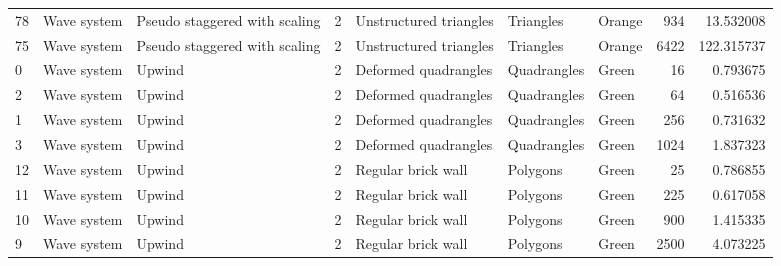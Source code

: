 \begin{tabular}{lllrlllrr}
78  &       Wave system &  Pseudo staggered with scaling &               2 &          Unstructured triangles &              Triangles  &                               Orange &                      934 &                        13.532008 \\
75  &       Wave system &  Pseudo staggered with scaling &               2 &          Unstructured triangles &              Triangles  &                               Orange &                     6422 &                       122.315737 \\
0   &       Wave system &                         Upwind &               2 &            Deformed quadrangles &            Quadrangles  &                                Green &                       16 &                         0.793675 \\
2   &       Wave system &                         Upwind &               2 &            Deformed quadrangles &            Quadrangles  &                                Green &                       64 &                         0.516536 \\
1   &       Wave system &                         Upwind &               2 &            Deformed quadrangles &            Quadrangles  &                                Green &                      256 &                         0.731632 \\
3   &       Wave system &                         Upwind &               2 &            Deformed quadrangles &            Quadrangles  &                                Green &                     1024 &                         1.837323 \\
12  &       Wave system &                         Upwind &               2 &              Regular brick wall &               Polygons  &                                Green &                       25 &                         0.786855 \\
11  &       Wave system &                         Upwind &               2 &              Regular brick wall &               Polygons  &                                Green &                      225 &                         0.617058 \\
10  &       Wave system &                         Upwind &               2 &              Regular brick wall &               Polygons  &                                Green &                      900 &                         1.415335 \\
9   &       Wave system &                         Upwind &               2 &              Regular brick wall &               Polygons  &                                Green &                     2500 &                         4.073225 \\

\end{tabular}
